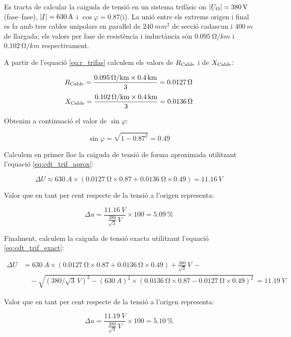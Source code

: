 \begin{exemple}
       Es tracta de calcular la caiguda de tensió en un sistema trifàsic on $|\cmplx{U}\ped{O}| = \SI{380}{V}$ (fase--fase), $|\cmplx{I}|=\SI{630}{A}$ i $\cos \varphi = \num{0,87}$(i). La unió entre els extrems origen  i final es fa amb tres cables unipolars en paraŀlel de $\SI{240}{mm^2}$ de secció cadascun i $\SI{400}{m}$ de llargada; els valors per fase de resistència i inductància són $\SI{0,095}{\ohm/km}$ i $\SI{0,102}{\ohm/km}$ respectivament.

    A partir de l'equació \eqref{eq:r_trifas} calculem els valors de $R_\mathrm{Cable}$ i de $X_\mathrm{Cable}$:

    \[
       R_\mathrm{Cable} = \frac{\SI{0,095}{\ohm/km}\times \SI{0,4}{km}}{3} = \SI{0,0127}{\ohm}
    \]
    \[
       X_\mathrm{Cable} = \frac{\SI{0,102}{\ohm/km}\times \SI{0,4}{km}}{3} = \SI{0,0136}{\ohm}
    \]

    Obtenim a continuació el valor de $\sin \varphi$:

    \[
       \sin \varphi = \sqrt{1-\num{0,87}^2} = \num{0,49}
    \]

    Calculem en primer lloc la caiguda de tensió de forma aproximada utilitzant l'equació \eqref{eq:cdt_trif_aprox}:

    \[
       \Delta U \approx \SI{630}{A} \times ( \SI{0,0127}{\ohm} \times \num{0,87} + \SI{0,0136}{\ohm} \times \num{0,49} ) = \SI{11,16}{V}
    \]

    Valor que en tant per cent respecte de la tensió a l'origen representa:

    \[
        \Delta u = \frac{\SI{11,16}{V}}{\frac{380}{\sqrt{3}}\si{\,V}} \times 100 = \SI{5,09}{\percent}
    \]

    Finalment, calculem la caiguda de tensió exacta utilitzant l'equació \eqref{eq:cdt_trif_exact}:

    \[ \begin{split}
       \Delta U &=  \SI{630}{A} \times( \SI{0,0127}{\ohm} \times \num{0,87} + \SI{0,0136}{\ohm} \times \num{0,49}) + \frac{380}{\sqrt{3}}\si{\,V} \,- \\
        & \quad - \sqrt{\left(380/\sqrt{3}\si{\,V}\right)^2 - \left(\SI{630}{A}\right)^2 \times  \left( \SI{0,0136}{\ohm} \times \num{0,87} - \SI{0,0127}{\ohm} \times \num{0,49} \right)^2 } \,= \SI{11,19}{V}
    \end{split} \]

    Valor que en tant per cent respecte de la tensió a l'origen representa:

    \[
        \Delta u = \frac{\SI{11,19}{V}}{\frac{380}{\sqrt{3}}\si{\,V}} \times 100 = \SI{5,10}{\percent}
    \]
\end{exemple}

